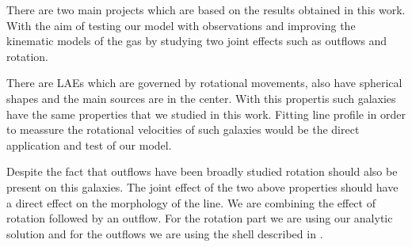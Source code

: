 There are two main projects which are based on the results obtained in 
this work. With the aim of testing our model with observations and
improving the kinematic models of the gas by studying two joint effects
such as outflows and rotation.  

There are LAEs which are governed by rotational movements, also 
have spherical shapes and the main \ly sources are in the center. 
With this propertis such galaxies have the same properties 
that we studied in this work.  
Fitting \ly line profile in order  to meassure the rotational 
velocities of such galaxies would be the direct application 
and test of our model.

Despite the fact that outflows have been broadly studied rotation should 
also be present on this galaxies. The joint effect of the two above properties 
should have a direct effect on the morphology of the \lya line. We are 
 combining the effect of rotation followed by an outflow. For the rotation 
part we are using our analytic solution and for the outflows we are using 
the shell described in \citep{Verhamme06}.



